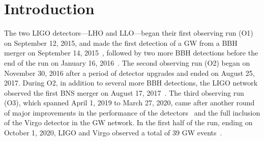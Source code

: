 \chapter{Introduction}

The two \ac{LIGO} detectors---\ac{LHO} and \ac{LLO}---began their first observing run (O1) on September 12, 2015, and made the first detection of a \ac{GW} from a \ac{BBH} merger on September 14, 2015~\cite{gw150914}, followed by two more \ac{BBH} detections before the end of the run on January 16, 2016~\cite{gwtc1}.
The second observing run (O2) began on November 30, 2016 after a period of detector upgrades and ended on August 25, 2017.
During O2, in addition to several more \ac{BBH} detections, the \ac{LIGO} network observed the first \ac{BNS} merger on August 17, 2017~\cite{gw170817}.
The third observing run (O3), which spanned April 1, 2019 to March 27, 2020, came after another round of major improvements in the performance of the detectors~\cite{Buikema_2020} and the full inclusion of the Virgo detector in the GW network.
In the first half of the run, ending on October 1, 2020, \ac{LIGO} and Virgo observed a total of 39 GW events~\cite{gwtc2}.
